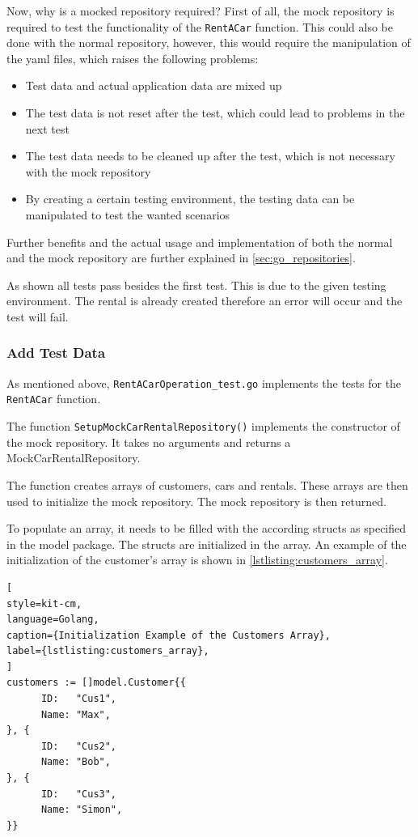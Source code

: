 Now, why is a mocked repository required?
First of all, the mock repository is required to test the functionality of the \texttt{RentACar} function.
This could also be done with the normal repository, however, this would require the manipulation of the yaml files, which raises the following problems:
\begin{itemize}
      \item Test data and actual application data are mixed up
      \item The test data is not reset after the test, which could lead to problems in the next test
      \item The test data needs to be cleaned up after the test, which is not necessary with the mock repository
      \item By creating a certain testing environment, the testing data can be manipulated to test the wanted scenarios
\end{itemize}

Further benefits and the actual usage and implementation of both the normal and the mock repository are further explained in \autoref{sec:go_repositories}.

As shown all tests pass besides the first test.
This is due to the given testing environment.
The rental is already created therefore an error will occur and the test will fail.

\subsubsection*{Add Test Data}
As mentioned above, \texttt{RentACarOperation\_test.go} implements the tests for the \texttt{RentACar} function.

The function \texttt{SetupMockCarRentalRepository()} implements the constructor of the mock repository.
It takes no arguments and returns a MockCarRentalRepository.

The function creates arrays of customers, cars and rentals.
These arrays are then used to initialize the mock repository.
The mock repository is then returned.

To populate an array, it needs to be filled with the according structs as specified in the model package.
The structs are initialized in the array.
An example of the initialization of the customer's array is shown in \autoref{lstlisting:customers_array}.

\begin{lstlisting}[
style=kit-cm,
language=Golang,
caption={Initialization Example of the Customers Array},
label={lstlisting:customers_array},
]
customers := []model.Customer{{
      ID:   "Cus1",
      Name: "Max",
}, {
      ID:   "Cus2",
      Name: "Bob",
}, {
      ID:   "Cus3",
      Name: "Simon",
}}
\end{lstlisting}

